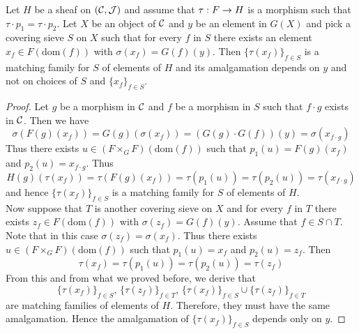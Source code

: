 \begin{lemma}\label{lemma:familythatismatchingifsatisfiesarelation}
Let $H$ be a sheaf on $({\mathcal C},{\mathcal J})$ and assume that $\tau:F\rightarrow H$ is a morphism such that $\tau\cdot p_1 = \tau \cdot p_2$. Let $X$ be an object of ${\mathcal C}$ and $y$ be an element in $G(X)$ and pick a covering sieve $S$ on $X$ such that for every $f$ in $S$ there exists an element $x_f\in F\left(\mathrm{dom}(f)\right)$ with $\sigma(x_f) = G(f)(y)$. Then $\{\tau(x_f)\}_{f\in S}$ is a matching family for $S$ of elements of $H$ and its amalgamation depends on $y$ and not on choices of $S$ and $\{x_f\}_{f\in S}$. 
\end{lemma}
\begin{proof}
Let $g$ be a morphism in ${\mathcal C}$ and $f$ be a morphism in $S$ such that $f\cdot g$ exists in ${\mathcal C}$. Then we have
$$\sigma\left(F(g)(x_f)\right)= G(g)\left(\sigma(x_f)\right) = \left(G(g)\cdot G(f)\right)(y) = \sigma(x_{f\cdot g})$$
Thus there exists $u\in \left(F\times_G F\right)(\mathrm{dom}(f))$ such that $p_1(u) = F(g)(x_f)$ and $p_2(u) = x_{f\cdot g}$. Thus
$$H(g)\left(\tau(x_f)\right) = \tau\left(F(g)(x_f)\right) = \tau\left(p_1(u)\right) = \tau\left(p_2(u)\right) = \tau\left(x_{f\cdot g}\right)$$
and hence $\{\tau(x_f)\}_{f\in S}$ is a matching family for $S$ of elements of $H$.\\
Now suppose that $T$ is another covering sieve on $X$ and for every $f$ in $T$ there exists $z_f\in F(\mathrm{dom}(f))$ with $\sigma(z_f) = G(f)(y)$. Assume that $f\in S\cap T$. Note that in this case $\sigma(z_f) = \sigma(x_f)$. Thus there exists $u\in \left(F\times_G F\right)(\mathrm{dom}(f))$ such that $p_1(u) = x_f$ and $p_2(u) = z_f$. Then
$$\tau(x_f) = \tau\left(p_1(u)\right) = \tau\left(p_2(u)\right) = \tau(z_f)$$
From this and from what we proved before, we derive that
$$\{\tau(x_f)\}_{f\in S},\,\{\tau(z_f)\}_{f\in T},\,\{\tau(x_f)\}_{f\in S}\cup \{\tau(z_f)\}_{f\in T}$$
are matching families of elements of $H$. Therefore, they must have the same amalgamation. Hence the amalgamation of $\{\tau(x_f)\}_{f\in S}$ depends only on $y$.
\end{proof}

